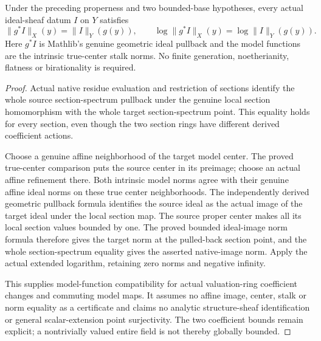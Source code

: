\begin{theorem}
\label{scheme:model-ideal-coefficient-change}
\leanok
{}
Under the preceding properness and two bounded-base hypotheses,
every actual ideal-sheaf datum $I$ on $Y$ satisfies
\[
 \|g^*I\|_X(y)=\|I\|_Y(g(y)),\qquad
 \log\|g^*I\|_X(y)=\log\|I\|_Y(g(y)).
\]
Here $g^*I$ is Mathlib's genuine geometric ideal pullback and the model
functions are the intrinsic true-center stalk norms. No finite
generation, noetherianity, flatness or birationality is required.
\end{theorem}
\begin{proof}
Actual native residue evaluation and restriction of sections identify
the whole source section-spectrum pullback under the genuine local
section homomorphism with the whole target section-spectrum point.
This equality holds for every section, even though the two section
rings have different derived coefficient actions.

Choose a genuine affine neighborhood of the target model center. The
proved true-center comparison puts the source center in its preimage;
choose an actual affine refinement there. Both intrinsic model norms
agree with their genuine affine ideal norms on these true center
neighborhoods. The independently derived geometric pullback formula
identifies the source ideal as the actual image of the target ideal
under the local section map. The source proper center makes all its
local section values bounded by one. The proved bounded ideal-image
norm formula therefore gives the target norm at the pulled-back section
point, and the whole section-spectrum equality gives the asserted
native-image norm. Apply the actual extended logarithm, retaining zero
norms and negative infinity.

This supplies model-function compatibility for actual valuation-ring
coefficient changes and commuting model maps. It assumes no affine
image, center, stalk or norm equality as a certificate and claims no
analytic structure-sheaf identification or general scalar-extension
point surjectivity. The two coefficient bounds remain explicit;
a nontrivially valued entire field is not thereby globally bounded.
\end{proof}
